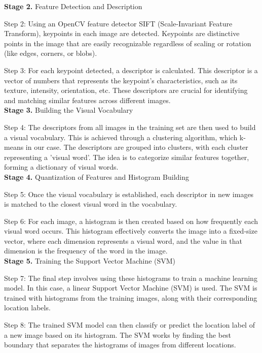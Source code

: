 \documentclass[conference]{IEEEtran}
\begin{document}
\textbf{Stage 2.} Feature Detection and Description

Step 2: Using an OpenCV feature detector SIFT (Scale-Invariant Feature Transform), keypoints in each image are detected. Keypoints are distinctive points in the image that are easily recognizable regardless of scaling or rotation (like edges, corners, or blobs).

Step 3: For each keypoint detected, a descriptor is calculated. This descriptor is a vector of numbers that represents the keypoint's characteristics, such as its texture, intensity, orientation, etc. These descriptors are crucial for identifying and matching similar features across different images.\\

\textbf{Stage 3.} Building the Visual Vocabulary

Step 4: The descriptors from all images in the training set are then used to build a visual vocabulary. This is achieved through a clustering algorithm, which k-means in our case. The descriptors are grouped into clusters, with each cluster representing a 'visual word'. The idea is to categorize similar features together, forming a dictionary of visual words.\\

\textbf{Stage 4.} Quantization of Features and Histogram Building

Step 5: Once the visual vocabulary is established, each descriptor in new images is matched to the closest visual word in the vocabulary. 

Step 6: For each image, a histogram is then created based on how frequently each visual word occurs. This histogram effectively converts the image into a fixed-size vector, where each dimension represents a visual word, and the value in that dimension is the frequency of the word in the image.\\

\textbf{Stage 5.} Training the Support Vector Machine (SVM)

Step 7: The final step involves using these histograms to train a machine learning model. In this case, a linear Support Vector Machine (SVM) is used. The SVM is trained with histograms from the training images, along with their corresponding location labels. 

Step 8: The trained SVM model can then classify or predict the location label of a new image based on its histogram. The SVM works by finding the best boundary that separates the histograms of images from different locations.
\end{document}

